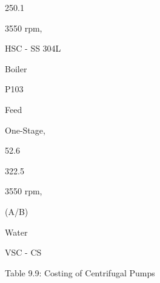 \documentclass[a4paper,portrait,12pt]{article}
\begin{document}
250.1





\begin{flushleft}
3550 rpm,
\end{flushleft}


\begin{flushleft}
HSC - SS 304L
\end{flushleft}





\begin{flushleft}
Boiler
\end{flushleft}


\begin{flushleft}
P103
\end{flushleft}


\begin{flushleft}
Feed
\end{flushleft}





\begin{flushleft}
One-Stage,
\end{flushleft}


52.6





322.5





\begin{flushleft}
3550 rpm,
\end{flushleft}





\begin{flushleft}
(A/B)
\end{flushleft}


\begin{flushleft}
Water
\end{flushleft}





\begin{flushleft}
VSC - CS
\end{flushleft}





\begin{flushleft}
Table 9.9: Costing of Centrifugal Pumps
\end{flushleft}
\end{document}
